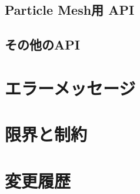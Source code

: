 \documentclass[12pt,a4paper,dvipdfmx]{jbook} %
\begin{document}
\section{Particle Mesh用 API}
\label{sec:PM_APIs}

\newpage
\section{その他のAPI}
\label{sec:other_APIs}

\newpage

\chapter{エラーメッセージ}
\label{chap:error_messages}

\newpage

\chapter{限界と制約}
\label{chap:limitation}

\newpage

\chapter{変更履歴}
\label{chap:change_log}


\printindex
\end{document}
